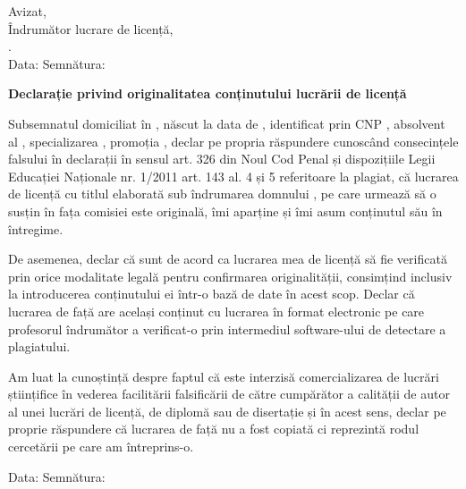 \vspace*{\fill}

\begin{flushright}
    Avizat, \\
    Îndrumător lucrare de licență, \\
    \coordinator. \\
    Data: \dottedline \hspace{1cm} Semnătura: \dottedline
\end{flushright}

\vspace{1cm}
\begin{center}
    \large
    \textbf{Declarație privind originalitatea conținutului lucrării de licență}
\end{center}

Subsemnatul \textbf{\authornamelf} domiciliat în \textbf{\authoraddress}, născut la data de \textbf{\authorbirth}, identificat prin CNP \textbf{\authorcnp}, absolvent al \textbf{\universityg}, \textbf{\faculty} specializarea \textbf{\speciality}, promoția \promotion, declar pe propria răspundere cunoscând consecințele falsului în declarații în sensul art. 326 din Noul Cod Penal și dispozițiile Legii Educației Naționale nr. 1/2011 art. 143 al. 4 și 5 referitoare la plagiat, că lucrarea de licență cu titlul \textbf{\thesistitle} elaborată sub îndrumarea domnului \textbf{\coordinator}, pe care urmează să o susțin în fața comisiei este originală, îmi aparține și îmi asum conținutul său în întregime.

De asemenea, declar că sunt de acord ca lucrarea mea de licență să fie verificată prin orice modalitate legală pentru confirmarea originalității, consimțind inclusiv la introducerea conținutului ei într-o bază de date în acest scop. Declar că lucrarea de față are același conținut cu lucrarea în format electronic pe care profesorul îndrumător a verificat-o prin intermediul software-ului de detectare a plagiatului.

Am luat la cunoștință despre faptul că este interzisă comercializarea de lucrări științifice în vederea facilitării falsificării de către cumpărător a calității de autor al unei lucrări de licență, de diplomă sau de disertație și în acest sens, declar pe proprie răspundere că lucrarea de față nu a fost copiată ci reprezintă rodul cercetării pe care am întreprins-o.

\begin{flushright}
    Data: \dottedline \hspace{6cm} Semnătura: \dottedline
\end{flushright}

\vspace*{\fill}
\pagebreak